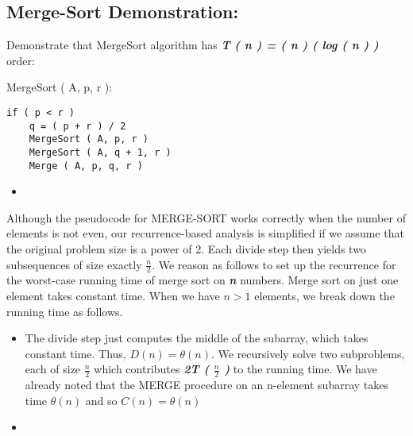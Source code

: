 \subsection{Merge-Sort Demonstration:}

Demonstrate that MergeSort algorithm has {\bfseries\itshape T ( n ) = ( n ) ( log ( n ) )} order:  \hfill \break

{\bfseries\color{Violet}{function}} MergeSort ( A, p, r ):
\begin{lstlisting}
if ( p < r )
	q = ( p + r ) / 2
	MergeSort ( A, p, r )
	MergeSort ( A, q + 1, r )
	Merge ( A, p, q, r )
\end{lstlisting}

\begin{itemize}
\item {\bfseries\itshape\color{Maroon}{Demonstration:}} \hfill
\end{itemize}

Although the pseudocode for MERGE-SORT works correctly when the number of elements is not even, our recurrence-based analysis is simplified if we assume that the original problem size is a power of 2. Each divide step then yields two subsequences of size exactly $\frac{n}{2}$. We reason as follows to set up the recurrence for the worst-case running time of merge sort on {\bfseries\itshape n} numbers. Merge sort on just one element takes constant time. When we have $n > 1$ elements, we break down the running time as follows.

\begin{itemize}
\item {\bfseries\itshape\color{Violet}{From equation 1:}} \hfill
\begin{tasks}
 The divide step just computes the middle of the subarray, which takes constant time. Thus, $D ( n ) = \theta ( n )$. 
 We recursively solve two subproblems, each of size $\frac{n}{2}$ which contributes {\bfseries\itshape 2T ( $\frac{n}{2}$ )} to the running time.
 We have already noted that the MERGE procedure on an n-element subarray takes time $\theta ( n )$ and so $C ( n ) = \theta ( n )$
\end{tasks}
\end{itemize} \hfill

\begin{itemize}
\item {\bfseries\itshape\color{Violet}{Then, our recurrence equations is:}}
\end{itemize} \hfill

